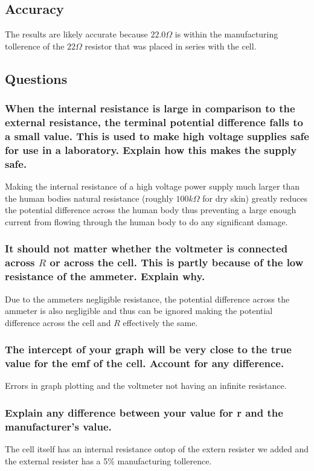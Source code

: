 \documentclass{article}
\begin{document}
\subsection{Accuracy}
The results are likely accurate because $22.0 \si{\Omega}$ is within the manufacturing
tollerence of the $22 \si{\Omega}$ resistor that was placed in series with the cell.

\subsection{Questions}

\subsubsection{When the internal resistance is large in comparison to the
	external resistance, the terminal potential difference falls to a small value.
	This is used to make high voltage supplies safe for use in a laboratory.
	Explain how this makes the supply safe.}

Making the internal resistance of a high voltage power supply much larger
than the human bodies natural resistance (roughly $100 \si{k\Omega}$ for dry
skin) greatly reduces the potential difference across the human body thus
preventing a large enough current from flowing through the human body to do any
significant damage.

\subsubsection{It should not matter whether the voltmeter is connected across $R$
	or across the cell. This is partly because of the low resistance of the
	ammeter. Explain why. }

Due to the ammeters negligible resistance, the potential difference across the
ammeter is also negligible and thus can be ignored making the potential
difference across the cell and $R$ effectively the same.

\subsubsection{The intercept of your graph will be very close to the true value
	for the emf of the cell. Account for any difference.}
Errors in graph plotting and the voltmeter not having an infinite resistance.

\subsubsection{Explain any difference between your value for r and the
	manufacturer’s value.}
The cell itself has an internal resistance ontop of the extern resister we
added and the external resister has a 5\% manufacturing tollerence.
\end{document}
